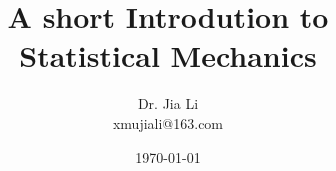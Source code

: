 \documentclass{ctexrep}[12pt,a4paper,openany]
\begin{document}
\title{\Huge A short Introdution to\\ Statistical Mechanics}
\author{Dr. Jia Li\\xmujiali@163.com}
\date{\today}
\maketitle
\tableofcontents







\end{document}
